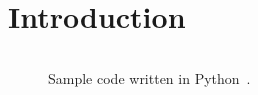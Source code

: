 \section*{Introduction}
\begin{figure}[h]
	\inputminted[linenos,firstline=57,lastline=79]{python}{../model-design-fischer-information-matrix/pool_model.py}
	\caption{Sample code written in Python~\cite{rossumPythonLanguageReference2010}.}
\end{figure}
